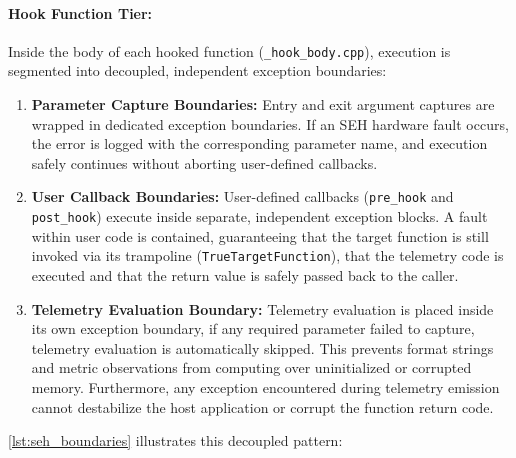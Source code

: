 \paragraph{Hook Function Tier:}
Inside the body of each hooked function (\texttt{\_hook\_body.cpp}), execution is segmented into decoupled, independent exception boundaries:
\begin{enumerate}
	\item \textbf{Parameter Capture Boundaries:}
	Entry and exit argument captures are wrapped in dedicated exception boundaries.
	If an \ac{SEH} hardware fault occurs, the error is logged with the corresponding parameter name, and execution safely continues without aborting user-defined callbacks.

	\item \textbf{User Callback Boundaries:}
	User-defined callbacks (\texttt{pre\_hook} and \texttt{post\_hook}) execute inside separate, independent exception blocks.
	A fault within user code is contained, guaranteeing that the target function is still invoked via its trampoline (\texttt{TrueTargetFunction}), that the telemetry code is executed and that the return value is safely passed back to the caller.

	\item \textbf{Telemetry Evaluation Boundary:}
	Telemetry evaluation is placed inside its own exception boundary, if any required parameter failed to capture, telemetry evaluation is automatically skipped. This prevents format strings and metric observations from computing over uninitialized or corrupted memory.
	Furthermore, any exception encountered during telemetry emission cannot destabilize the host application or corrupt the function return code.
\end{enumerate}

\cref{lst:seh_boundaries} illustrates this decoupled pattern:

